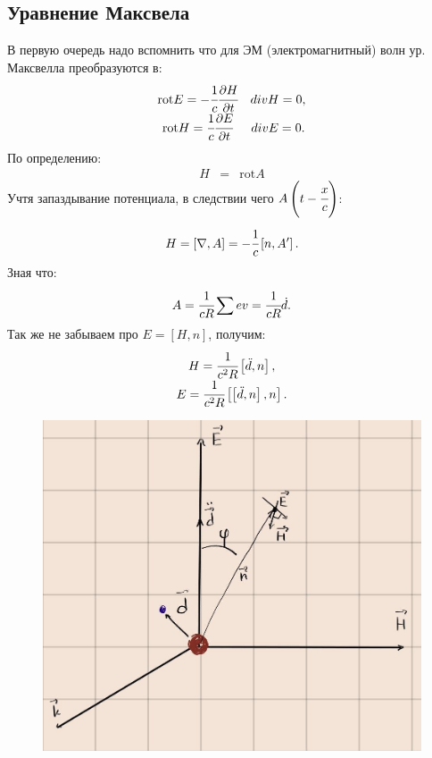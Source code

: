 \documentclass[a4paper]{article}
\newcommand{\inner}[1]{\left( #1 \right)}
\newcommand{\insqr}[1]{\left[ #1 \right]}
\newcommand{\rot}{\text{rot}}
\numberwithin{equation}{section}
\begin{document}
\subsection{Уравнение Максвела}
В первую очередь надо вспомнить что для ЭМ (электромагнитный) волн 
ур. Максвелла преобразуются в:
\begin{gather}
    \begin{matrix}
        \rot E = -\cfrac{1}{c} \cfrac{\partial H}{\partial t} & div H = 0, \\
        \rot H = \cfrac{1}{c} \cfrac{\partial E}{\partial t} & div E = 0.
    \end{matrix}
\end{gather} 
По определению:
\begin{eqnarray}
    H &=& \rot A
\end{eqnarray} 
Учтя запаздывание потенциала, в следствии чего $A\inner{t - \cfrac{x}{c}}$:
\begin{gather}
    H = \insqr{\nabla, A} = -\cfrac{1}{c}\insqr{n, A'}.
\end{gather}
Зная что:
\begin{equation}
    A = \cfrac{1}{cR} \sum ev = \cfrac{1}{cR} \dot d.
\end{equation}
Так же не забываем про $E = \insqr{H, n}$, получим:
\begin{eqnarray}
    \begin{matrix}
        H = \cfrac{1}{c^2R}\insqr{\ddot d, n}, \\
        E = \cfrac{1}{c^2R}\insqr{\insqr{\ddot d, n}, n}.
    \end{matrix}
    \label{eq:2.5}
\end{eqnarray}
\begin{figure}[h]
    \centering
    \includegraphics[trim={0 0 0 0},clip,width=\textwidth]{sh.jpg}
    \label{pict}
\end{figure}
\end{document}
